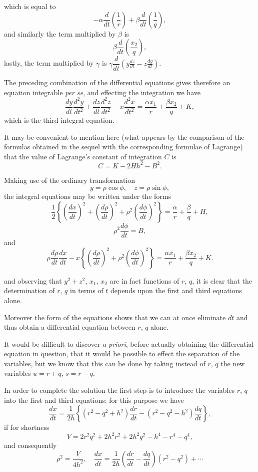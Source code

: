 \documentclass[12pt,a4paper]{article}
\theoremstyle{plain}
\theoremstyle{definition}
\begin{document}
\newpage
[182]

which is equal to
\[
-\alpha\frac{d}{dt}\left(\frac{1}{r}\right) + \beta\frac{d}{dt}\left(\frac{1}{q}\right),
\]
and similarly the term multiplied by $\beta$ is
\[
\beta\frac{d}{dt}\left(\frac{x_2}{q}\right),
\]
lastly, the term multiplied by $\gamma$ is $\gamma\dfrac{d}{dt}(y\tfrac{dz}{dt} - z\tfrac{dy}{dt})$.

The preceding combination of the differential equations gives therefore an equation integrable \textit{per se}, and effecting the integration we have
\[
\frac{dy}{dt}\frac{d^2y}{dt^2} + \frac{dz}{dt}\frac{d^2z}{dt^2} - x\frac{d^2x}{dt^2} = \frac{\alpha x_1}{r} + \frac{\beta x_2}{q} + K,
\]
which is the third integral equation.

It may be convenient to mention here (what appears by the comparison of the formulas obtained in the sequel with the corresponding formulae of Lagrange) that the value of Lagrange's constant of integration $C$ is
\[
C = K - 2Hh^2 - B^2.
\]

\newpage
[182]

Making use of the ordinary transformation
\[
y = \rho \cos \phi, \quad z = \rho \sin \phi,
\]
the integral equations may be written under the forms
\[
\frac{1}{2}\left\{\left(\frac{dx}{dt}\right)^2 + \left(\frac{d\rho}{dt}\right)^2 + \rho^2\left(\frac{d\phi}{dt}\right)^2\right\} = \frac{\alpha}{r} + \frac{\beta}{q} + H, \tag{1, $b$}
\]
\[
\rho^2\frac{d\phi}{dt} = B, \tag{2, $b$}
\]
and
\[
\rho\frac{d\rho}{dt}\frac{dx}{dt} - x\left\{\left(\frac{d\rho}{dt}\right)^2 + \rho^2\left(\frac{d\phi}{dt}\right)^2\right\} = \frac{\alpha x_1}{r} + \frac{\beta x_2}{q} + K. \tag{3, $b$}
\]

and observing that $y^2 + z^2$, $x_1$, $x_2$ are in fact functions of $r$, $q$, it is clear that the determination of $r$, $q$ in terms of $t$ depends upon the first and third equations alone.

Moreover the form of the equations shows that we can at once eliminate $dt$ and thus obtain a differential equation between $r$, $q$ alone.

It would be difficult to discover \textit{a priori}, before actually obtaining the differential equation in question, that it would be possible to effect the separation of the variables, but we know that this can be done by taking instead of $r$, $q$ the new variables $u = r + q$, $s = r - q$.

In order to complete the solution the first step is to introduce the variables $r$, $q$ into the first and third equations: for this purpose we have
\[
\frac{dx}{dt} = \frac{1}{2h}\left\{(r^2 - q^2 + h^2)\frac{dr}{dt} - (r^2 - q^2 - h^2)\frac{dq}{dt}\right\},
\]
if for shortness
\[
V = 2r^2q^2 + 2h^2r^2 + 2h^2q^2 - h^4 - r^4 - q^4,
\]
and consequently
\[
\rho^2 = \frac{V}{4h^2}, \quad \frac{dx}{dt} = \frac{1}{2h}\left(\frac{dr}{dt} - \frac{dq}{dt}\right)(r^2 - q^2) + \cdots
\]
\end{document}
